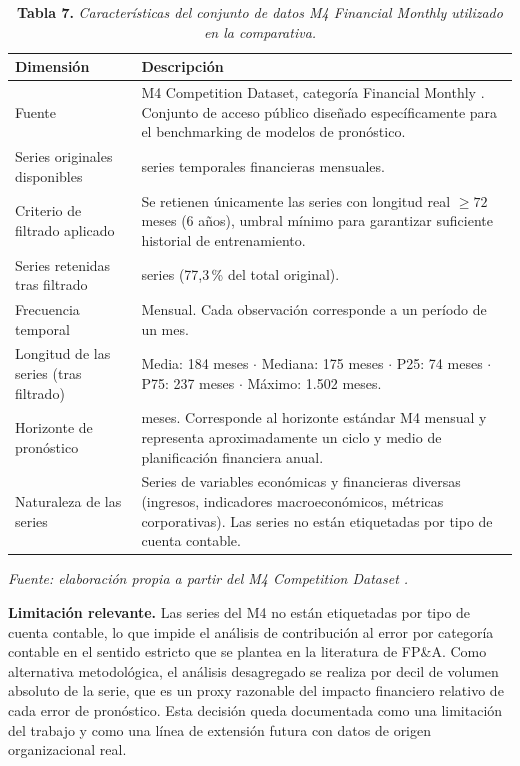 \begin{table}[H]
\caption{\textbf{Tabla 7.} \textit{Características del conjunto de datos M4 Financial Monthly utilizado en la comparativa.}}
\label{tab:dataset}
\vspace{4pt}
\begin{tabular}{>{\raggedright\arraybackslash}p{4cm} >{\raggedright\arraybackslash}p{9.5cm}}
\toprule
\textbf{Dimensión} & \textbf{Descripción} \\
\midrule
Fuente & M4 Competition Dataset, categoría Financial Monthly \parencite{Makridakis2020M4}. Conjunto de acceso público diseñado específicamente para el benchmarking de modelos de pronóstico. \\
Series originales disponibles & 10.987 series temporales financieras mensuales. \\
Criterio de filtrado aplicado & Se retienen únicamente las series con longitud real $\geq 72$ meses (6 años), umbral mínimo para garantizar suficiente historial de entrenamiento. \\
Series retenidas tras filtrado & 8.493 series (77,3\,\% del total original). \\
Frecuencia temporal & Mensual. Cada observación corresponde a un período de un mes. \\
Longitud de las series (tras filtrado) & Media: 184 meses $\cdot$ Mediana: 175 meses $\cdot$ P25: 74 meses $\cdot$ P75: 237 meses $\cdot$ Máximo: 1.502 meses. \\
Horizonte de pronóstico & 18 meses. Corresponde al horizonte estándar M4 mensual y representa aproximadamente un ciclo y medio de planificación financiera anual. \\
Naturaleza de las series & Series de variables económicas y financieras diversas (ingresos, indicadores macroeconómicos, métricas corporativas). Las series no están etiquetadas por tipo de cuenta contable. \\
\bottomrule
\end{tabular}
\vspace{4pt}

\small\textit{Fuente: elaboración propia a partir del M4 Competition Dataset \parencite{Makridakis2020M4}.}
\end{table}

\textbf{Limitación relevante.} Las series del M4 no están etiquetadas por tipo de cuenta contable, lo que impide el análisis de contribución al error por categoría contable en el sentido estricto que se plantea en la literatura de FP\&A. Como alternativa metodológica, el análisis desagregado se realiza por decil de volumen absoluto de la serie, que es un proxy razonable del impacto financiero relativo de cada error de pronóstico. Esta decisión queda documentada como una limitación del trabajo y como una línea de extensión futura con datos de origen organizacional real.

